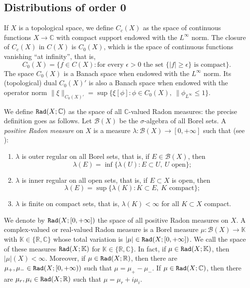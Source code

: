 \documentclass[a4paper,9pt]{amsart}
\newcommand{\scr}[1]{\mathscr{#1}}
\newcommand{\R}{\mathbb{R}}	%
\newcommand{\C}{\mathbb{C}}	%
\newcommand{\K}{\mathbb{K}}	%
\theoremstyle{plain}
\theoremstyle{definition}
\theoremstyle{remark}
\begin{document}
\subsection{Distributions of order 0}\label{subs67df019e}

If $X$ is a topological space, we define $C_c(X)$ as the space of continuous functions $X\to\C$ with compact support endowed with the $L^\infty$ norm.
The closure of $C_c(X)$ in $C(X)$ is $C_0(X)$, which is the space of continuous functions vanishing ``at infinity'', that is,
\begin{equation}
	C_0(X) = \{f\in C(X): \text{for every $\epsilon>0$ the set $\{|f|\ge\epsilon\}$ is compact}\} .
\end{equation}
The space $C_0(X)$ is a Banach space when endowed with the $L^\infty$ norm.
Its (topological) dual $C_0(X)'$ is also a Banach space when endowed with the operator norm $\|\xi\|_{ C_0(X)'} = \sup\{\xi[\phi] : \phi\in C_0(X),\ \|\phi_{L^\infty}\le 1\}$.

We define $\radon(X;\C)$ as the space of all $\C$-valued Radon measures: the precise definition goes as follows.
Let $\scr B(X)$ be the $\sigma$-algebra of all Borel sets.
A \emph{positive Radon measure} on $X$ is a measure $\lambda:\scr B(X)\to[0,+\infty]$ such that (see \cite[page 212]{MR767633}):
\begin{enumerate}
\item
	$\lambda$ is outer regular on all Borel sets, that is, if $E\in\scr B(X)$, then
	\begin{equation}
		\lambda(E) = \inf\{\lambda(U) : E\subset U,\ U\text{ open}\} ;
	\end{equation}
\item
	$\lambda$ is inner regular on all open sets, that is, if $E\subset X$ is open, then
	\begin{equation}
		\lambda(E) = \sup\{\lambda(K) : K\subset E,\ K\text{ compact}\} ;
	\end{equation}
\item
	$\lambda$ is finite on compact sets, that is, $\lambda(K)<\infty$ for all $K\subset X$ compact.
\end{enumerate}
We denote by $\mathtt{Rad}(X;[0,+\infty])$ the space of all positive Radon measures on $X$.
A complex-valued or real-valued Radon measure is a Borel measure $\mu:\scr B(X)\to\K$ with $\K\in\{\R,\C\}$ whose total variation is $|\mu|\in\mathtt{Rad}(X;[0,+\infty])$.
We call the space of these measures $\radon(X;\K)$ for $\K\in\{\R,\C\}$.
In fact, if $\mu\in\radon(X;\K)$, then $|\mu|(X)<\infty$.
Moreover, if $\mu\in\radon(X;\R)$, then there are $\mu_+,\mu_-\in\mathtt{Rad}(X;[0,+\infty))$ such that $\mu=\mu_+-\mu_-$.
If $\mu\in\radon(X;\C)$, then there are $\mu_r,\mu_i\in\radon(X;\R)$ such that $\mu=\mu_r + i\mu_i$.
\end{document}
